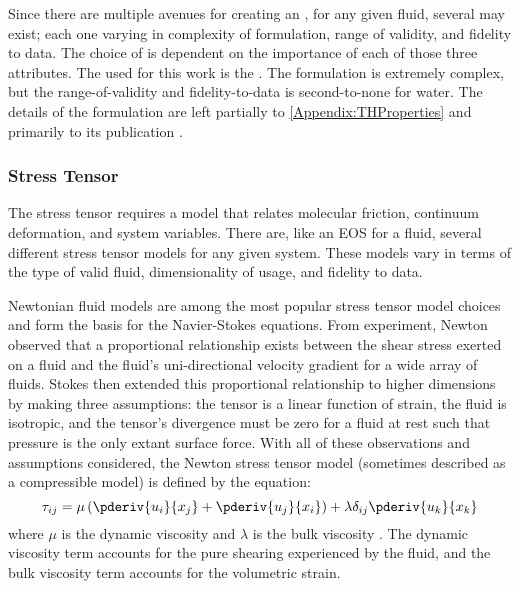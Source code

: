 Since there are multiple avenues for creating an , for any given fluid, several may exist; each one varying in complexity of formulation, range of validity, and fidelity to data.
The choice of  is dependent on the importance of each of those three attributes.
The  used for this work is the .
The  formulation is extremely complex, but the range-of-validity and fidelity-to-data is second-to-none for water.
The details of the formulation are left partially to \cref{Appendix:THProperties} and primarily to its publication \cite{iapws_revised_2009}.




\subsubsection{Stress Tensor}\label{SubSubSection:StressTensor}
The stress tensor requires a model that relates molecular friction, continuum deformation, and system variables.
There are, like an EOS for a fluid, several different stress tensor models for any given system.
These models vary in terms of the type of valid fluid, dimensionality of usage, and fidelity to data.

Newtonian fluid models are among the most popular stress tensor model choices and form the basis for the Navier-Stokes equations.
From experiment, Newton observed that a proportional relationship exists between the shear stress exerted on a fluid and the fluid's uni-directional velocity gradient for a wide array of fluids.
Stokes then extended this proportional relationship to higher dimensions by making three assumptions: the tensor is a linear function of strain, the fluid is isotropic, and the tensor's divergence must be zero for a fluid at rest such that pressure is the only extant surface force.
With all of these observations and assumptions considered, the Newton stress tensor model (sometimes described as a compressible model) is defined by the equation:
\begin{equation}
    \tau_{ij} = \mu \left(\pderiv{u_i}{x_j} + \pderiv{u_j}{x_i}\right) + \lambda \delta_{ij} \pderiv{u_k}{x_k}
\end{equation}
where $\mu$ is the dynamic viscosity and $\lambda$ is the bulk viscosity \cite{johnson_handbook_1998-2}.
The dynamic viscosity term accounts for the pure shearing experienced by the fluid, and the bulk viscosity term accounts for the volumetric strain.

